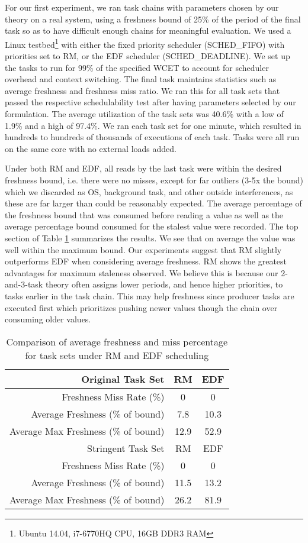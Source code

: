 For our first experiment, we ran task chains with parameters chosen by our theory on a real system, using a freshness bound of 25\% of the period of the final task so as to have difficult enough chains for meaningful evaluation. We used a Linux testbed\footnote{Ubuntu 14.04, i7-6770HQ CPU, 16GB DDR3 RAM} with either the fixed priority scheduler (SCHED\_FIFO) with priorities set to RM, or the EDF scheduler (SCHED\_DEADLINE). We set up the tasks to run for 99\% of the specified WCET to account for scheduler overhead and context switching. The final task maintains statistics such as average freshness and freshness miss ratio. We ran this for all task sets that passed the respective schedulability test after having parameters selected by our formulation. The average utilization of the task sets was 40.6\% with a low of 1.9\% and a high of 97.4\%. We ran each task set for one minute, which resulted in hundreds to hundreds of thousands of executions of each task. Tasks were all run on the same core with no external loads added.

Under both RM and EDF, all reads by the last task were within the desired freshness bound, i.e. there were no misses, except for far outliers (3-5x the bound) which we discarded as OS, background task, and other outside interferences, as these are far larger than could be reasonably expected. The average percentage of the freshness bound that was consumed before reading a value as well as the average percentage bound consumed for the stalest value were recorded. The top section of Table \ref{table:fresh} summarizes the results. We see that on average the value was well within the maximum bound. Our experiments suggest that RM slightly outperforms EDF when considering average freshness. RM shows the greatest advantages for maximum staleness observed. We believe this is because our 2-and-3-task theory often assigns lower periods, and hence higher priorities, to tasks earlier in the task chain. This may help freshness since producer tasks are executed first which prioritizes pushing newer values though the chain over consuming older values.

\begin{table}[h]
\caption{Comparison of average freshness and miss percentage for task sets under RM and EDF scheduling}
\label{table:fresh}
\begin{center}
	\begin{tabular}{|r|c|c|}
		\hline
		Original Task Set & RM & EDF \\
		\hline
		Freshness Miss Rate (\%) & 0 & 0 \\
		Average Freshness (\% of bound) & 7.8 & 10.3 \\
		Average Max Freshness (\% of bound) & 12.9 & 52.9 \\
		\hline
		Stringent Task Set & RM & EDF \\
		\hline
		Freshness Miss Rate (\%) & 0 & 0 \\
		Average Freshness (\% of bound) & 11.5 & 13.2 \\
		Average Max Freshness (\% of bound) & 26.2 & 81.9 \\
		\hline
	\end{tabular}
\end{center}
\end{table}

